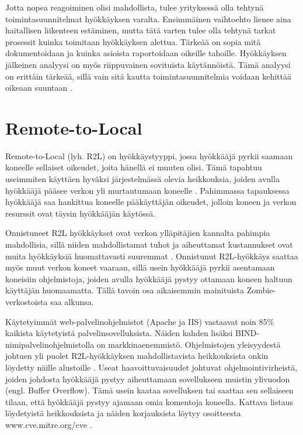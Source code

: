 Jotta nopea reagoiminen olisi mahdollista, tulee yrityksessä olla tehtynä
toimintasuunnitelmat hyökkäyksen varalta. Ensimmäinen vaihtoehto lienee aina
haitallisen liikenteen estäminen, mutta tätä varten tulee olla tehtynä tarkat
prosessit kuinka toimitaan hyökkäyksen alettua. Tärkeää on sopia mitä
dokumentoidaan ja kuinka asioista raportoidaan oikeille tahoille. Hyökkäyksen
jälkeinen analyysi on myös riippuvainen sovituista käytännöistä. Tämä analyysi
on erittäin tärkeää, sillä vain sitä kautta toimintasuunnitelmia voidaan
kehittää oikeaan suuntaan \cite{DDOS}.


\section{Remote-to-Local}

Remote-to-Local (lyh. R2L) on hyökkäystyyppi, jossa hyökkääjä pyrkii
saamaan koneelle sellaiset oikeudet, joita hänellä ei muuten
olisi. Tämä tapahtuu useimmiten käyttäen hyväksi järjestelmässä olevia
heikkouksia, joiden avulla hyökkääjä pääsee verkon yli murtautumaan
koneelle \cite{IDS}. Pahimmassa tapauksessa hyökkääjä saa hankittua koneelle
pääkäyttäjän oikeudet, jolloin koneen ja verkon resurssit ovat täysin
hyökkääjän käytössä.

Onnistuneet R2L hyökkäykset ovat verkon ylläpitäjien kannalta pahimpia
mahdollisia, sillä niiden mahdollistamat tuhot ja aiheuttamat kustannukset ovat
muita hyökkäyksiä huomattavasti suuremmat \cite{IDSb}. Onnistunut R2L-hyökkäys saattaa
myös muut verkon koneet vaaraan, sillä usein hyökkääjä pyrkii asentamaan
koneisiin ohjelmistoja, joiden avulla hyökkääjä pystyy ottamaan koneen haltuun
käyttäjän huomaamatta. Tällä tavoin osa aikaisemmin mainituista Zombie-
verkostoista saa alkunsa.

Käytetyimmät web-palvelinohjelmistot (Apache ja IIS) vastaavat noin 85\%
kaikista käytetyistä palvelinsovelluksista. Näiden kahden lisäksi BIND-
nimipalvelinohjelmistolla on markkinaenemmistö. Ohjelmistojen yleisyydestä
johtuen yli puolet R2L-hyökkäyksen mahdollistavista heikkouksista onkin
löydetty näille alustoille \cite{IDS}. Useat haavoittuvaisuudet johtuvat
ohjelmointivirheistä, joiden johdosta hyökkääjä pystyy aiheuttamaan
sovellukseen muistin ylivuodon (engl. Buffer Overflow). Tämä usein kaataa
sovelluksen tai saattaa sen sellaiseen tilaan, että hyökkääjä pystyy ajamaan
omia komentoja koneella. Kattava listaus löydetyistä heikkouksista ja näiden
korjauksista löytyy osoitteesta www.cve.mitre.org/cve \cite{CVE}.

